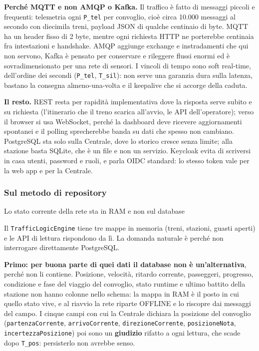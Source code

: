\documentclass[11pt]{article}
\begin{document}
\textbf{Perché MQTT e non AMQP o Kafka.} Il traffico è fatto di messaggi piccoli e frequenti: telemetria
ogni \texttt{P\_tel} per convoglio, cioè circa 10.000 messaggi al secondo con diecimila treni, payload JSON
di qualche centinaio di byte. MQTT ha un header fisso di 2 byte, mentre ogni richiesta HTTP ne
porterebbe centinaia fra intestazioni e handshake. AMQP aggiunge exchange e instradamenti che qui
non servono, Kafka è pensato per conservare e rileggere flussi enormi ed è sovradimensionato per
una rete di sensori. I vincoli di tempo sono soft real-time, dell'ordine dei secondi (\texttt{P\_tel},
\texttt{T\_sil}): non serve una garanzia dura sulla latenza, bastano la consegna almeno-una-volta e il
keepalive che si accorge della caduta.

\textbf{Il resto.} REST resta per rapidità implementativa dove la risposta serve subito e su richiesta (l'itinerario che il treno
scarica all'avvio, le API dell'operatore); verso il browser si usa WebSocket, perché la dashboard
deve ricevere aggiornamenti spontanei e il polling sprecherebbe banda su dati che spesso non
cambiano. PostgreSQL sta solo sulla Centrale, dove lo storico cresce senza limite; alla stazione
basta SQLite, che è un file e non un servizio. Keycloak evita di scriversi in casa utenti,
password e ruoli, e parla OIDC standard: lo stesso token vale per la web app e per la Centrale.
\subsubsection{Sul metodo di repository}
\label{sec:orgc03c00f}
Lo stato corrente della rete sta in RAM e non sul database

Il \texttt{TrafficLogicEngine} tiene tre mappe in memoria (treni, stazioni, guasti aperti) e le API di
lettura rispondono da lì. La domanda naturale è perché non interrogare direttamente PostgreSQL.

\textbf{Primo: per buona parte di quei dati il database non è un'alternativa}, perché non li contiene.
Posizione, velocità, ritardo corrente, passeggeri, progresso, condizione e fase del viaggio del
convoglio, stato runtime e ultimo battito della stazione non hanno colonne nello schema: la mappa
in RAM è il posto in cui quello stato vive, e al riavvio la rete riparte OFFLINE e lo riscopre dai
messaggi del campo. I cinque campi con cui la Centrale dichiara la posizione del convoglio
(\texttt{partenzaCorrente}, \texttt{arrivoCorrente}, \texttt{direzioneCorrente}, \texttt{posizioneNota},
\texttt{incertezzaPosizione}) poi sono un \textbf{giudizio} rifatto a ogni lettura, che scade dopo \texttt{T\_pos}:
persisterlo non avrebbe senso.
\end{document}
